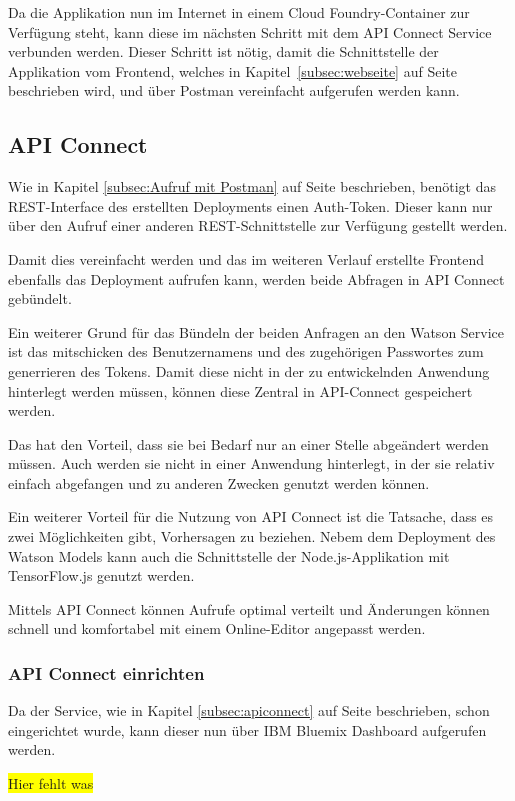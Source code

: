 Da die Applikation nun im Internet in einem Cloud Foundry-Container zur Verfügung steht, kann diese im nächsten Schritt
mit dem API Connect Service verbunden werden. Dieser Schritt ist nötig, damit die Schnittstelle der Applikation vom
Frontend, welches in Kapitel~\ref{subsec:webseite} auf Seite~\pageref{subsec:webseite} beschrieben wird, und über Postman
vereinfacht aufgerufen werden kann.

\subsection{API Connect}
Wie in Kapitel \ref{subsec:Aufruf mit Postman} auf Seite \pageref{subsec:Aufruf mit Postman} beschrieben, benötigt das
REST-Interface des erstellten Deployments einen Auth-Token. Dieser kann nur über den Aufruf einer anderen
REST-Schnittstelle zur Verfügung gestellt werden.

Damit dies vereinfacht werden und das im weiteren Verlauf erstellte Frontend ebenfalls das Deployment aufrufen kann,
werden beide Abfragen in API Connect gebündelt.

Ein weiterer Grund für das Bündeln der beiden Anfragen an den Watson Service ist das mitschicken des Benutzernamens und
des zugehörigen Passwortes zum generrieren des Tokens. Damit diese nicht in der zu entwickelnden Anwendung hinterlegt
werden müssen, können diese Zentral in API-Connect gespeichert werden.

Das hat den Vorteil, dass sie bei Bedarf nur an einer Stelle abgeändert werden müssen. Auch werden sie nicht in einer
Anwendung hinterlegt, in der sie relativ einfach abgefangen und zu anderen Zwecken genutzt werden können.

Ein weiterer Vorteil für die Nutzung von API Connect ist die Tatsache, dass es zwei Möglichkeiten gibt, Vorhersagen zu
beziehen. Nebem dem Deployment des Watson Models kann auch die Schnittstelle der Node.js-Applikation mit TensorFlow.js
genutzt werden.

Mittels API Connect können Aufrufe optimal verteilt und Änderungen können schnell und komfortabel mit einem Online-Editor
angepasst werden.

\subsubsection{API Connect einrichten}
Da der Service, wie in Kapitel \ref{subsec:apiconnect} auf Seite \pageref{subsec:apiconnect} beschrieben, schon
eingerichtet wurde, kann dieser nun über IBM Bluemix Dashboard aufgerufen werden.

\colorbox{yellow}{Hier fehlt was}